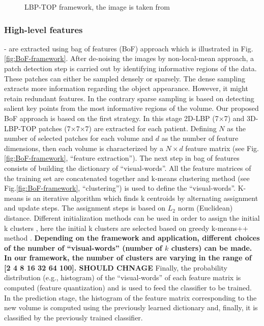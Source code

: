 \begin{figure}
\caption{LBP-TOP framework, the image is taken from \cite{JiangEtAl13}}
\label{fig:LBPTOP-framework}
\end{figure}



\subsubsection{High-level features} - are extracted using bag of features (BoF) approach which is illustrated in Fig. \ref{fig:BoF-framework}. After de-noising the images by non-local-mean approach, a patch detection step is carried out by identifying informative regions of the data. These patches can either be sampled densely or sparsely. The dense sampling extracts more information regarding the object appearance. However, it might retain redundant features. In the contrary sparse sampling is based on detecting salient key points from the most informative regions of the volume. Our proposed BoF approach is based on the first strategy. In this stage 2D-LBP (7$\times$7) and 3D-LBP-TOP patches (7$\times$7$\times$7) are extracted for each patient. Defining $N$ as the number of selected patches for each volume and $d$ as the number of feature dimensions, then each volume is characterized by a $N \times d$ feature matrix (see Fig. \ref{fig:BoF-framework}, ``feature extraction''). The next step in bag of features consists of building the dictionary of ``visual-words''. All the feature matrices of the training set are concatenated together and k-means clustering method (see Fig.\ref{fig:BoF-framework}, ``clustering'') is used to define the ``visual-words''. K-means is an iterative algorithm which finds k centroids by alternating assignment and update steps. The assignment steps is based on $L_{2}$ norm (Euclidean) distance. Different initialization methods can be used in order to assign the initial k clusters \cite {celebi2013comparative}, here the initial k clusters are selected based on greedy k-means++ method \cite{arthur2007k}. \textbf{Depending on the framework and application, different choices of the number of ``visual-words'' (number of $k$ clusters) can be made. In our framework, the number of clusters are varying in the range of [2 4 8 16 32 64 100]. SHOULD CHNAGE} Finally, the probability distribution (e.g., histogram) of the ``visual-words'' of each feature matrix is computed (feature quantization) and is used to feed the classifier to be trained. In the prediction stage, the histogram of the feature matrix corresponding to the new volume is computed using the previously learned dictionary and, finally, it is classified by the previously trained classifier.\\



